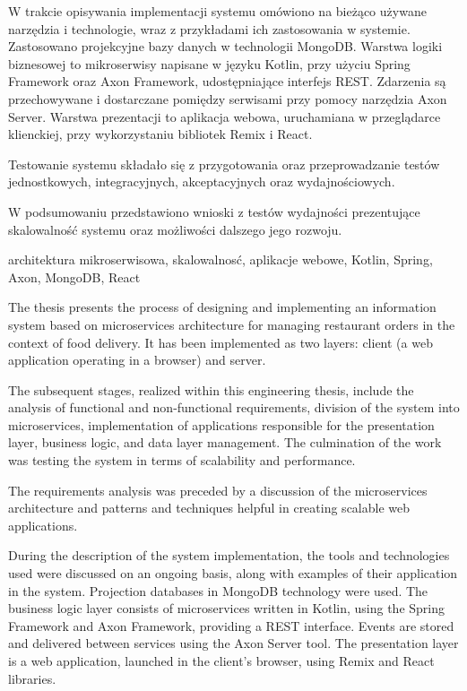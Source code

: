 \documentclass[
    bindingoffset=5mm,  %
    footnoteindent=3mm, %
    hyphenation=true    %
]{src/wut-thesis}
\begin{document}
W trakcie opisywania implementacji systemu omówiono na bieżąco używane narzędzia i technologie, wraz z przykładami ich zastosowania w systemie. Zastosowano projekcyjne bazy danych w technologii MongoDB. Warstwa logiki biznesowej to mikroserwisy napisane w języku Kotlin, przy użyciu Spring Framework oraz Axon Framework, udostępniające interfejs REST. Zdarzenia są przechowywane i dostarczane pomiędzy serwisami przy pomocy narzędzia Axon Server. Warstwa prezentacji to aplikacja webowa, uruchamiana w przeglądarce klienckiej, przy wykorzystaniu bibliotek Remix i React.

Testowanie systemu składało się z przygotowania oraz przeprowadzanie testów jednostkowych, integracyjnych, akceptacyjnych oraz wydajnościowych.

W podsumowaniu przedstawiono wnioski z testów wydajności prezentujące skalowalność systemu oraz możliwości dalszego jego rozwoju.

\keywords architektura mikroserwisowa, skalowalnosć, aplikacje webowe, Kotlin, Spring, Axon, MongoDB, React

\clearpage
\secondabstract

The thesis presents the process of designing and implementing an information system based on microservices architecture for managing restaurant orders in the context of food delivery. It has been implemented as two layers: client (a web application operating in a browser) and server.

The subsequent stages, realized within this engineering thesis, include the analysis of functional and non-functional requirements, division of the system into microservices, implementation of applications responsible for the presentation layer, business logic, and data layer management. The culmination of the work was testing the system in terms of scalability and performance.

The requirements analysis was preceded by a discussion of the microservices architecture and patterns and techniques helpful in creating scalable web applications.

During the description of the system implementation, the tools and technologies used were discussed on an ongoing basis, along with examples of their application in the system. Projection databases in MongoDB technology were used. The business logic layer consists of microservices written in Kotlin, using the Spring Framework and Axon Framework, providing a REST interface. Events are stored and delivered between services using the Axon Server tool. The presentation layer is a web application, launched in the client's browser, using Remix and React libraries.
\end{document}
